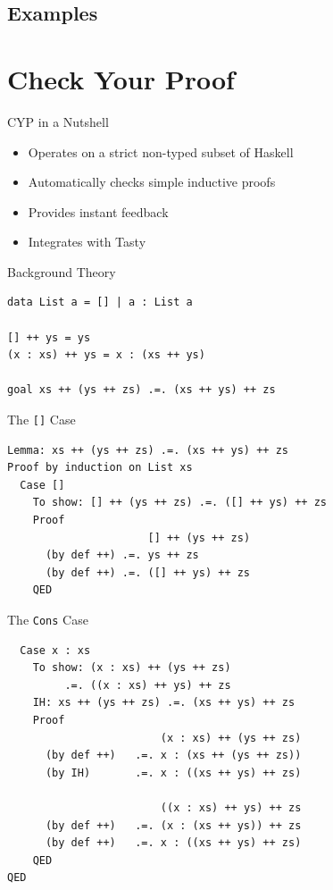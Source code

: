 \documentclass{beamer}
\begin{document}
\subsection{Examples}

\section{Check Your Proof}

\begin{frame}{CYP in a Nutshell}

\begin{itemize}[<+->]
  \item Operates on a strict non-typed subset of Haskell
  \item Automatically checks simple inductive proofs
  \item Provides instant feedback
  \item Integrates with Tasty
\end{itemize}
\end{frame}

\begin{frame}[fragile]{Background Theory}
  \begin{lstlisting}
data List a = [] | a : List a

[] ++ ys = ys
(x : xs) ++ ys = x : (xs ++ ys)

goal xs ++ (ys ++ zs) .=. (xs ++ ys) ++ zs
  \end{lstlisting}
\end{frame}

\begin{frame}[fragile]{The \texttt{[]} Case}
  \begin{lstlisting}
Lemma: xs ++ (ys ++ zs) .=. (xs ++ ys) ++ zs
Proof by induction on List xs
  Case []
    To show: [] ++ (ys ++ zs) .=. ([] ++ ys) ++ zs
    Proof
                      [] ++ (ys ++ zs)
      (by def ++) .=. ys ++ zs
      (by def ++) .=. ([] ++ ys) ++ zs
    QED
  \end{lstlisting}
\end{frame}

\begin{frame}[fragile]{The \texttt{Cons} Case}
  \begin{lstlisting}
  Case x : xs
    To show: (x : xs) ++ (ys ++ zs)
         .=. ((x : xs) ++ ys) ++ zs
    IH: xs ++ (ys ++ zs) .=. (xs ++ ys) ++ zs
    Proof
                        (x : xs) ++ (ys ++ zs)
      (by def ++)   .=. x : (xs ++ (ys ++ zs))
      (by IH)       .=. x : ((xs ++ ys) ++ zs)

                        ((x : xs) ++ ys) ++ zs
      (by def ++)   .=. (x : (xs ++ ys)) ++ zs
      (by def ++)   .=. x : ((xs ++ ys) ++ zs)
    QED
QED
  \end{lstlisting}
\end{frame}
\end{document}
